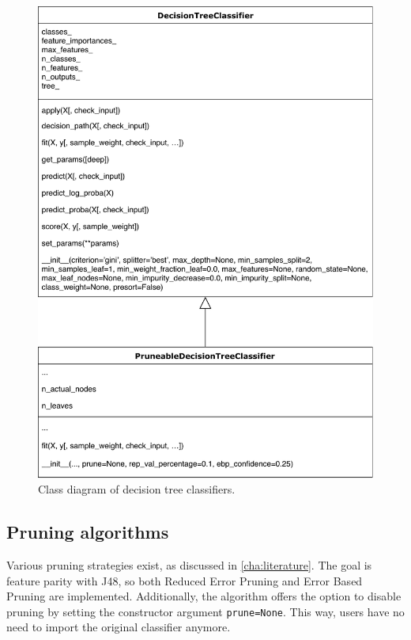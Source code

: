 \begin{figure}[htp]
    \centering
    \includegraphics[width=\textwidth]{img/DecisionTreeClasses.pdf}
    \caption{Class diagram of decision tree classifiers.}%
    \label{fig:classifier_classes}
\end{figure}

\subsection{Pruning algorithms}
Various pruning strategies exist, as discussed in \autoref{cha:literature}. The goal is feature parity with J48, so both Reduced Error Pruning and Error Based Pruning are implemented. Additionally, the algorithm offers the option to disable pruning by setting the constructor argument \texttt{prune=None}. This way, users have no need to import the original classifier anymore.

